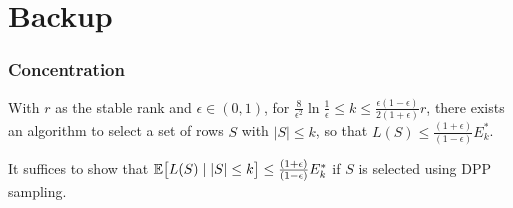 \documentclass[12pt]{sty/colt2019/colt2018-arxiv}
\begin{document}

\section{Backup}


\subsubsection{Concentration}

\begin{lemma} With $r$ as the stable rank and $\epsilon \in (0,1)$, for $ \frac 8{\epsilon^2} \ln \frac1{\epsilon} \leq k \leq  \frac {\epsilon (1-\epsilon)}{2(1+\epsilon)}  r $, there exists an algorithm to select a set of rows $S$ with $|S| \leq k$, so that $L(S)  \leq \frac{(1+\epsilon)}{(1- \epsilon) } E^*_k$. 
\end{lemma}
It suffices to show that $\mathbb E\big[L(S)\mid |S|\leq k\big]  \leq \frac{(1+\epsilon)}{(1- \epsilon) } E^*_k$ if $S$ is selected using DPP sampling. 
\end{document}
